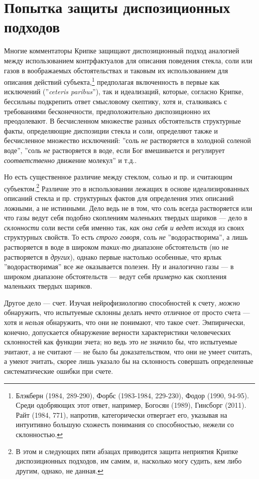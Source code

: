 \documentclass[11pt]{book}
\begin{document}
\section{Попытка защиты диспозиционных подходов}

Многие комментаторы Крипке защищают диспозиционный подход аналогией между использованием контрфактуалов для описания поведения стекла, соли или газов в воображаемых обстоятельствах и таковым их использованием для описания действий субъекта,\footnote{Блэкберн (1984, 289-290), Форбс (1983-1984, 229-230), Фодор (1990, 94-95). Среди одобряющих этот ответ, например, Богосян (1989), Гинсборг (2011). Райт (1984, 771), напротив, категорически отвергает его, указывая на интуитивно большую схожесть понимания со способностью, нежели со склонностью.} предполагая включенность в первые как исключений (''\textit{ceteris paribus}''), так и идеализаций, которые, согласно Крипке, бессильны подкрепить ответ смысловому скептику, хотя и, сталкиваясь с требованиями бесконечности, предположительно диспозиционно их преодолевают. В бесчисленном множестве разных обстоятельств структурные факты, определяющие диспозиции стекла и соли, определяют также и бесчисленное множество исключений: ''соль \textit{не} растворяется в холодной соленой воде'', ''соль \textit{не} растворяется в воде, если Бог вмешивается и регулирует \textit{соответственно} движение молекул'' и т.д..

Но есть существенное различие между стеклом, солью и пр. и считающим субъектом.\footnote{В этом и следующих пяти абзацах приводится защита неприятия Крипке диспозиционных подходов, им самим, и, насколько могу судить, кем либо другим, однако, не данная.} Различие это в использовании лежащих в основе идеализированных описаний стекла и пр. структурных фактов для определения этих описаний ложными, а не истинными. Дело ведь не в том, что соль всегда растворяется или что газы ведут себя подобно скоплениям маленьких твердых шариков --- дело в \textit{склонности} соли вести себя именно так, \textit{как она себя и ведет} исходя из своих структурных свойств. То есть \textit{строго говоря}, соль \textit{не} ''водорастворима'', а лишь растворяется в воде в широком \textit{таких-то} диапазоне обстоятельств (но не растворяется в \textit{других}), однако первые настолько особенные, что ярлык ''водорастворимая'' все же оказывается полезен. Ну и аналогично газы --- в широком диапазоне обстоятельств --- ведут себя \textit{примерно} как скопления маленьких твердых шариков.

Другое дело --- счет. Изучая нейрофизиологию способностей к счету, \textit{можно} обнаружить, что испытуемые склонны делать нечто отличное от просто счета --- хотя и \textit{нельзя} обнаружить, что они не понимают, что такое счет. Эмпирически, конечно, допускается обнаружение верности характеристики человеческих склонностей как функции зчета; но ведь это \textit{не} значило бы, что испытуемые зчитают, а не считают --- не было бы доказательством, что они не умеет считать, а умеют зчитать, скорее лишь указало бы на склонность совершать определенные систематические ошибки при счете.
\end{document}

